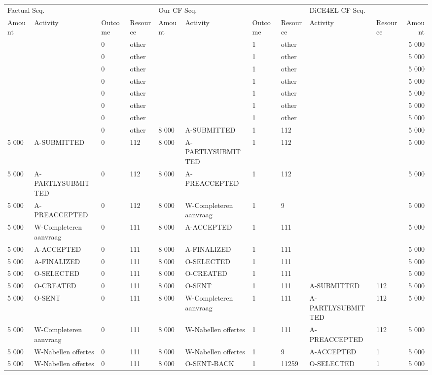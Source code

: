 \begin{tabular}{llllllllllr}
\toprule
\multicolumn{4}{l}{Factual Seq.} & \multicolumn{4}{l}{Our CF Seq.} & \multicolumn{3}{l}{DiCE4EL CF Seq.} \\
Amount & Activity & Outcome & Resource & Amount & Activity & Outcome & Resource & Activity & Resource & Amount \\
\midrule
 &  & 0 & other &  &  & 1 & other &  &  & 5 000 \\
 &  & 0 & other &  &  & 1 & other &  &  & 5 000 \\
 &  & 0 & other &  &  & 1 & other &  &  & 5 000 \\
 &  & 0 & other &  &  & 1 & other &  &  & 5 000 \\
 &  & 0 & other &  &  & 1 & other &  &  & 5 000 \\
 &  & 0 & other &  &  & 1 & other &  &  & 5 000 \\
 &  & 0 & other &  &  & 1 & other &  &  & 5 000 \\
 &  & 0 & other & 8 000 & A-SUBMITTED & 1 & 112 &  &  & 5 000 \\
5 000 & A-SUBMITTED & 0 & 112 & 8 000 & A-PARTLYSUBMITTED & 1 & 112 &  &  & 5 000 \\
5 000 & A-PARTLYSUBMITTED & 0 & 112 & 8 000 & A-PREACCEPTED & 1 & 112 &  &  & 5 000 \\
5 000 & A-PREACCEPTED & 0 & 112 & 8 000 & W-Completeren aanvraag & 1 & 9 &  &  & 5 000 \\
5 000 & W-Completeren aanvraag & 0 & 111 & 8 000 & A-ACCEPTED & 1 & 111 &  &  & 5 000 \\
5 000 & A-ACCEPTED & 0 & 111 & 8 000 & A-FINALIZED & 1 & 111 &  &  & 5 000 \\
5 000 & A-FINALIZED & 0 & 111 & 8 000 & O-SELECTED & 1 & 111 &  &  & 5 000 \\
5 000 & O-SELECTED & 0 & 111 & 8 000 & O-CREATED & 1 & 111 &  &  & 5 000 \\
5 000 & O-CREATED & 0 & 111 & 8 000 & O-SENT & 1 & 111 & A-SUBMITTED & 112 & 5 000 \\
5 000 & O-SENT & 0 & 111 & 8 000 & W-Completeren aanvraag & 1 & 111 & A-PARTLYSUBMITTED & 112 & 5 000 \\
5 000 & W-Completeren aanvraag & 0 & 111 & 8 000 & W-Nabellen offertes & 1 & 111 & A-PREACCEPTED & 112 & 5 000 \\
5 000 & W-Nabellen offertes & 0 & 111 & 8 000 & W-Nabellen offertes & 1 & 9 & A-ACCEPTED & 1 & 5 000 \\
5 000 & W-Nabellen offertes & 0 & 111 & 8 000 & O-SENT-BACK & 1 & 11259 & O-SELECTED & 1 & 5 000 \\

\end{tabular}
